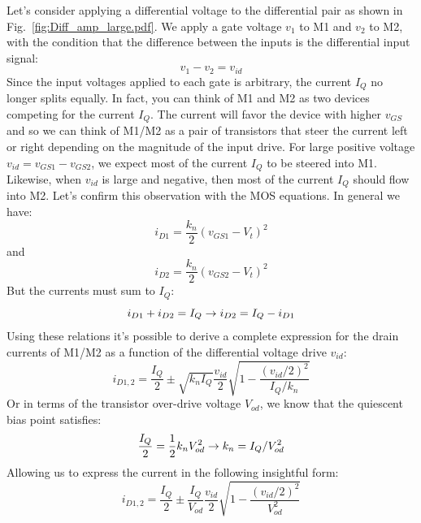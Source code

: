Let's consider applying a differential voltage to the differential pair as shown in Fig.~\ref{fig:Diff_amp_large.pdf}.  We apply a gate voltage $v_1$ to M1 and $v_2$ to M2, with the condition that the difference between the inputs is the differential input signal:
\begin{equation}
	v_1 - v_2 = v_{id}
\end{equation}
%
Since the input voltages applied to each gate is arbitrary, the current $I_Q$ no longer splits equally.  In fact, you can think of M1 and M2 as two devices competing for the current $I_Q$.  The current will favor the device with higher $v_{GS}$ and so we can think of M1/M2 as a pair of transistors that steer the current left or right depending on the magnitude of the input drive.  For large positive voltage $v_{id} = v_{GS1} - v_{GS2}$, we expect most of the current $I_Q$ to be steered into M1.  Likewise, when $v_{id}$ is large and negative, then most of the current $I_Q$ should flow into M2.  Let's confirm this observation with the MOS equations.  In general we have:
\begin{equation}
	{i_{D1}} = \frac{{{k_n}}}{2}{\left( {{v_{GS1}} - {V_t}} \right)^2}
\end{equation}
%
and
%
\begin{equation} 
	{i_{D2}} = \frac{{{k_n}}}{2}{\left( {{v_{GS2}} - {V_t}} \right)^2}
\end{equation}
%
But the currents must sum to $I_Q$:
\begin{equation}
	{i_{D1}} + {i_{D2}} = I_Q \rightarrow
		{\rm{ }}{i_{D2}} = I_Q - {i_{D1}}
\end{equation}
%
Using these relations it's possible to derive a complete expression for the drain currents of M1/M2 as a function of the differential voltage drive $v_{id}$:
%
\begin{equation}
	{i_{D1,2}} = \frac{I_Q}{2} \pm \sqrt {{k_n}I_Q} \frac{{{v_{id}}}}{2}\sqrt {1 - \frac{{{{({v_{id}}/2)}^2}}}{{I_Q/{k_n}}}} 
\end{equation}
%
Or in terms of the transistor over-drive voltage $V_{od}$, we know that the quiescent bias point satisfies:
%
\begin{equation}
	\frac{I_Q}{2} = \frac{1}{2}{k_n}V_{od}^2{\rm{ }} \rightarrow {k_n} = I_Q/V_{od}^2 
\end{equation}
%
Allowing us to express the current in the following insightful form:
\begin{equation} 
	{i_{D1,2}} = \frac{I_Q}{2} \pm \frac{I_Q}{{{V_{od}}}}\frac{{{v_{id}}}}{2}\sqrt {1 - \frac{{{{({v_{id}}/2)}^2}}}{{V_{od}^2}}} 
	\label{eq:diff_large}
\end{equation}
